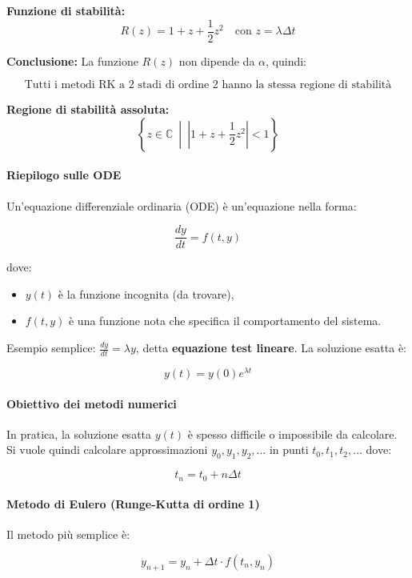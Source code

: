 \documentclass[12pt,a4paper]{article}
\begin{document}
\textbf{Funzione di stabilità:}
\[
\boxed{R(z) = 1 + z + \frac{1}{2} z^2 \quad \text{con } z = \lambda \Delta t}
\]

\textbf{Conclusione:}
La funzione \( R(z) \) non dipende da \( \alpha \), quindi:

\[
\boxed{
\text{Tutti i metodi RK a 2 stadi di ordine 2 hanno la stessa regione di stabilità}
}
\]

\textbf{Regione di stabilità assoluta:}
\[
\boxed{
\left\{ z \in \mathbb{C} \ \middle| \ \left| 1 + z + \frac{1}{2}z^2 \right| < 1 \right\}
}
\]


\paragraph*{Riepilogo sulle ODE}

Un’equazione differenziale ordinaria (ODE) è un’equazione nella forma:

\[
\frac{dy}{dt} = f(t, y)
\]

dove:
\begin{itemize}
    \item \( y(t) \) è la funzione incognita (da trovare),
    \item \( f(t, y) \) è una funzione nota che specifica il comportamento del sistema.
\end{itemize}

Esempio semplice: \( \frac{dy}{dt} = \lambda y \), detta \textbf{equazione test lineare}. La soluzione esatta è:

\[
y(t) = y(0) e^{\lambda t}
\]

\paragraph{Obiettivo dei metodi numerici}

In pratica, la soluzione esatta \( y(t) \) è spesso difficile o impossibile da calcolare. Si vuole quindi calcolare approssimazioni \( y_0, y_1, y_2, \dots \) in punti \( t_0, t_1, t_2, \dots \) dove:

\[
t_n = t_0 + n \Delta t
\]

\paragraph{Metodo di Eulero (Runge-Kutta di ordine 1)}

Il metodo più semplice è:

\[
y_{n+1} = y_n + \Delta t \cdot f(t_n, y_n)
\]
\end{document}
